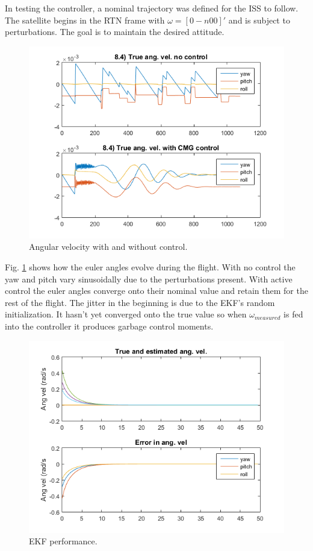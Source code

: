 \documentclass[12pt, letterpaper]{article}
\begin{document}
In testing the controller, a nominal trajectory was defined for the ISS to follow. The satellite begins in the RTN frame with $\omega=[0 -n0 0]'$ and is subject to perturbations. The goal is to maintain the desired attitude.

\begin{figure}[H]
	\centering
	\includegraphics[scale=0.8]{ps8_01}
	\caption{Angular velocity with and without control.}
	\label{8:angvel}
\end{figure}

Fig. \ref{8:angvel} shows how the euler angles evolve during the flight. With no control the yaw and pitch vary sinusoidally due to the perturbations present. With active control the euler angles converge onto their nominal value and retain them for the rest of the flight. The jitter in the beginning is due to the EKF's random initialization. It hasn't yet converged onto the true value so when $\omega_{measured}$ is fed into the controller it produces garbage control moments.

\begin{figure}[H]
	\centering
	\includegraphics[scale=0.8]{ps8_02}
	\caption{EKF performance.}
	\label{8:ekf}
\end{figure}
\end{document}
